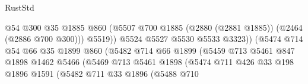 \begin{lexlean}{RustStd}
\begin{coremodule}
                                              @54
                                              @300
                                              @35
                                              @1885
                                              @860
                                              (@5507
                                                @700
                                                @1885
                                                (@2880 (@2881 @1885))
                                                (@2464 (@2886 @700 @300)))
                                              @5519))
                                          @5524
                                          @5527
                                          @5530
                                          @5533
                                          @3323))
                                      (@5474
                                        @714
                                        @54
                                        @66
                                        @35
                                        @1899
                                        @860
                                        (@5482
                                          @714
                                          @66
                                          @1899
                                          (@5459
                                            @713
                                            @5461
                                            @847
                                            @1898
                                            @1462
                                            @5466
                                            (@5469
                                              @713
                                              @5461
                                              @1898
                                              (@5474
                                                @711
                                                @426
                                                @33
                                                @198
                                                @1896
                                                @1591
                                                (@5482
                                                  @711
                                                  @33
                                                  @1896
                                                  (@5488
                                                    @710

\end{coremodule}
\end{lexlean}
